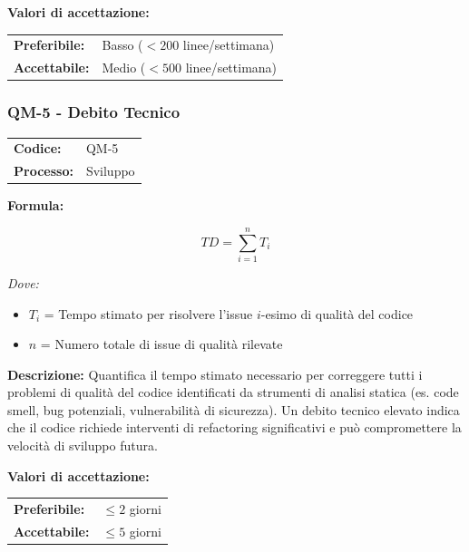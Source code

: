 \documentclass[a4paper,11pt,oneside]{scrartcl}
\begin{document}
\vspace{0.2cm}
\noindent\textbf{Valori di accettazione:}
\vspace{0.1cm}

\noindent
\begin{tabular}{@{}ll@{}}
\textbf{Preferibile:} & Basso ($< 200$ linee/settimana) \\
\textbf{Accettabile:} & Medio ($< 500$ linee/settimana) \\
\end{tabular}

\subsubsection{QM-5 - Debito Tecnico}

\noindent
\begin{tabular}{@{}p{}p{}@{}}
\textbf{Codice:} & QM-5 \\
\textbf{Processo:} & Sviluppo \\
\end{tabular}

\vspace{0.3cm}
\noindent\textbf{Formula:}

\[
TD = \sum_{i=1}^{n} T_i
\]

\noindent\textit{Dove:}
\begin{itemize}[leftmargin=1.5cm, topsep=0pt, itemsep=0pt]
    \item $T_i$ = Tempo stimato per risolvere l'issue $i$-esimo di qualità del codice
    \item $n$ = Numero totale di issue di qualità rilevate
\end{itemize}

\noindent\textbf{Descrizione:} Quantifica il tempo stimato necessario per correggere tutti i problemi di qualità del codice identificati da strumenti di analisi statica (es. code smell{\scriptsize{}}, bug potenziali, vulnerabilità di sicurezza). Un debito tecnico elevato indica che il codice richiede interventi di refactoring significativi e può compromettere la velocità di sviluppo futura.

\vspace{0.2cm}
\noindent\textbf{Valori di accettazione:}
\vspace{0.1cm}

\noindent
\begin{tabular}{@{}ll@{}}
\textbf{Preferibile:} & $\le 2$ giorni \\
\textbf{Accettabile:} & $\le 5$ giorni \\
\end{tabular}
\end{document}
